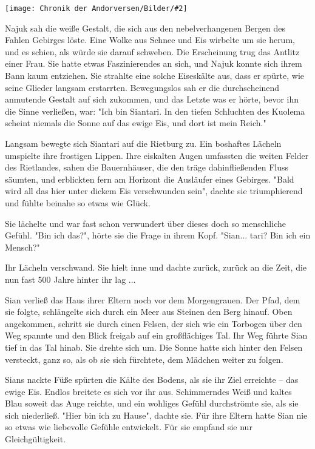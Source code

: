 \documentclass[10pt, a4paper, oneside]{book}
\newcommand{\bildmitts}[2][height=0.32\textwidth,width=0.48\textwidth,keepaspectratio]{%
    \begin{center}
        \texttt{[image: Chronik der Andorversen/Bilder/\#2]}
    \end{center}
}
\begin{document}
\begin{multicols}{2}
\bildmitts{Siantari (2018).jpg}

Najuk sah die weiße Gestalt, die sich aus den nebelverhangenen Bergen des Fahlen Gebirges löste. Eine Wolke aus Schnee und Eis wirbelte um sie herum, und es schien, als würde sie darauf schweben. Die Erscheinung trug das Antlitz einer Frau. Sie hatte etwas Faszinierendes an sich, und Najuk konnte sich ihrem Bann kaum entziehen. Sie strahlte eine solche Eiseskälte aus, dass er spürte, wie seine Glieder langsam erstarrten. Bewegungslos sah er die durchscheinend anmutende Gestalt auf sich zukommen, und das Letzte was er hörte, bevor ihn die Sinne verließen, war: "Ich bin Siantari. In den tiefen Schluchten des Kuolema scheint niemals die Sonne auf das ewige Eis, und dort ist mein Reich."

Langsam bewegte sich Siantari auf die Rietburg zu. Ein boshaftes Lächeln umspielte ihre frostigen Lippen. Ihre eiskalten Augen umfassten die weiten Felder des Rietlandes, sahen die Bauernhäuser, die den träge dahinfließenden Fluss säumten, und erblickten fern am Horizont die Ausläufer eines Gebirges. "Bald wird all das hier unter dickem Eis verschwunden sein", dachte sie triumphierend und fühlte beinahe so etwas wie Glück.

Sie lächelte und war fast schon verwundert über dieses doch so menschliche Gefühl. "Bin ich das?", hörte sie die Frage in ihrem Kopf. "Sian... tari? Bin ich ein Mensch?"

Ihr Lächeln verschwand. Sie hielt inne und dachte zurück, zurück an die Zeit, die nun fast 500 Jahre hinter ihr lag ...\bigskip

Sian verließ das Haus ihrer Eltern noch vor dem Morgengrauen. Der Pfad, dem sie folgte, schlängelte sich durch ein Meer aus Steinen den Berg hinauf. Oben angekommen, schritt sie durch einen Felsen, der sich wie ein Torbogen über den Weg spannte und den Blick freigab auf ein großflächiges Tal. Ihr Weg führte Sian tief in das Tal hinab. Sie drehte sich um. Die Sonne hatte sich hinter den Felsen versteckt, ganz so, als ob sie sich fürchtete, dem Mädchen weiter zu folgen.

Sians nackte Füße spürten die Kälte des Bodens, als sie ihr Ziel erreichte – das ewige Eis. Endlos breitete es sich vor ihr aus. Schimmerndes Weiß und kaltes Blau soweit das Auge reichte, und ein wohliges Gefühl durchströmte sie, als sie sich niederließ. "Hier bin ich zu Hause", dachte sie. Für ihre Eltern hatte Sian nie so etwas wie liebevolle Gefühle entwickelt. Für sie empfand sie nur Gleichgültigkeit.\bigskip


\end{multicols}
\end{document}
